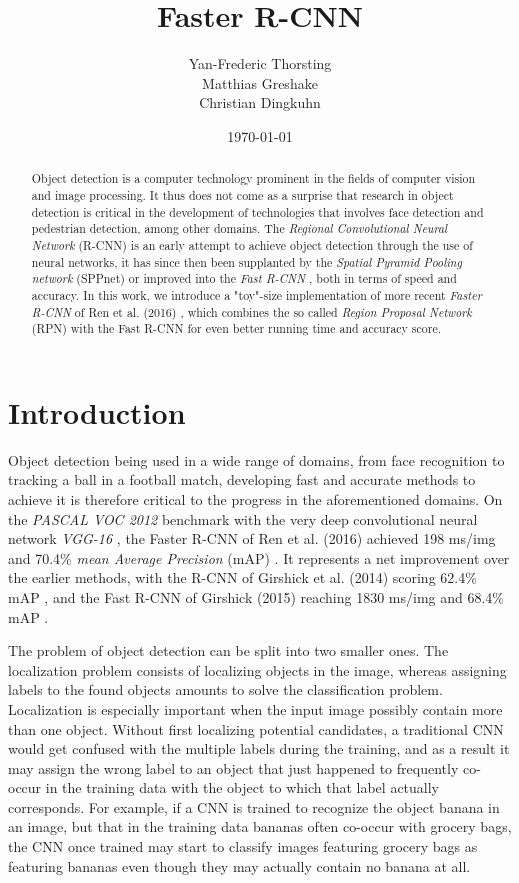 \documentclass[a4paper]{article}
\title{Faster R-CNN}
\author{Yan-Frederic Thorsting\\Matthias Greshake\\Christian Dingkuhn}
\date{\today}
\begin{document}
\maketitle

\begin{abstract}
Object detection is a computer technology prominent in the fields of computer vision and image processing. It thus does not come as a surprise that research in object detection is critical in the development of technologies that involves face detection and pedestrian detection, among other domains. The \emph{Regional Convolutional Neural Network} (R-CNN) \cite{rcnn} is an early attempt to achieve object detection through the use of neural networks, it has since then been supplanted by the \emph{Spatial Pyramid Pooling network} (SPPnet) \cite{sppnet} or improved into the \emph{Fast R-CNN} \cite{fastrcnn}, both in terms of speed and accuracy. In this work, we introduce a "toy"-size implementation of more recent \emph{Faster R-CNN} of Ren et al. (2016) \cite{fasterrcnn}, which combines the so called \emph{Region Proposal Network} (RPN) \cite{fasterrcnn} with the Fast R-CNN for even better running time and accuracy score.
\end{abstract}

\section{Introduction}

Object detection being used in a wide range of domains, from face recognition to tracking a ball in a football match, developing fast and accurate methods to achieve it is therefore critical to the progress in the aforementioned domains. On the \emph{PASCAL VOC 2012} benchmark \cite{voc} with the very deep convolutional neural network \emph{VGG-16} \cite{vgg}, the Faster R-CNN of Ren et al. (2016) achieved 198 ms/img and 70.4\% \emph{mean Average Precision} (mAP) \cite{fasterrcnn}. It represents a net improvement over the earlier methods, with the R-CNN of Girshick et al. (2014) scoring 62.4\% mAP \cite{fastrcnn}, and the Fast R-CNN of Girshick (2015) reaching 1830 ms/img and 68.4\% mAP \cite{fasterrcnn}.

The problem of object detection can be split into two smaller ones. The localization problem consists of localizing objects in the image, whereas assigning labels to the found objects amounts to solve the classification problem. Localization is especially important when the input image possibly contain more than one object. Without first localizing potential candidates, a traditional CNN would get confused with the multiple labels during the training, and as a result it may assign the wrong label to an object that just happened to frequently co-occur in the training data with the object to which that label actually corresponds. For example,  if a CNN is trained to recognize the object banana in an image, but that in the training data bananas often co-occur with grocery bags, the CNN once trained may start to classify images featuring grocery bags as featuring bananas even though they may actually contain no banana at all.
\end{document}
